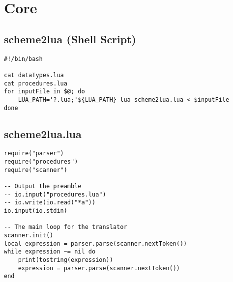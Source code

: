 \section{Core}
\subsection{scheme2lua (Shell Script)}

\scriptsize

\begin{verbatim}
#!/bin/bash

cat dataTypes.lua
cat procedures.lua
for inputFile in $@; do
    LUA_PATH='?.lua;'${LUA_PATH} lua scheme2lua.lua < $inputFile
done
\end{verbatim}

\subsection{scheme2lua.lua}
\begin{verbatim}
require("parser")
require("procedures")
require("scanner")

-- Output the preamble
-- io.input("procedures.lua")
-- io.write(io.read("*a"))
io.input(io.stdin)

-- The main loop for the translator
scanner.init()
local expression = parser.parse(scanner.nextToken())
while expression ~= nil do
    print(tostring(expression))
    expression = parser.parse(scanner.nextToken())
end
\end{verbatim}

